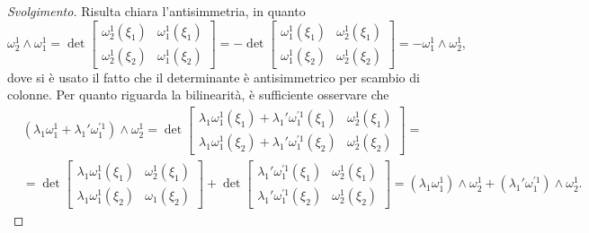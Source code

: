 \begin{proof}[Svolgimento]
    Risulta chiara l'antisimmetria, in quanto
    $$
        \omega_2^1 \wedge \omega_1^1 = \det{\begin{bmatrix}
            \omega_2^1(\xi_1) & \omega_1^1(\xi_1) \\
            \omega_2^1(\xi_2) & \omega_1^1(\xi_2)
        \end{bmatrix}} = - \det{\begin{bmatrix}
            \omega_1^1(\xi_1) & \omega_2^1(\xi_1) \\
            \omega_1^1(\xi_2) & \omega_2^1(\xi_2)
        \end{bmatrix}} = - \omega_1^1 \wedge \omega_2^1,
    $$
    dove si è usato il fatto che il determinante è antisimmetrico per scambio di colonne.
    Per quanto riguarda la bilinearità, è sufficiente osservare che
    \begin{align*}
        &(\lambda_1 \omega_1^1 + \lambda_1' \omega_1^{'1}) \wedge \omega_2^1 = \det{\begin{bmatrix}
            \lambda_1 \omega_1^1(\xi_1) + \lambda_1' \omega_1^{'1}(\xi_1) & \omega_2^1(\xi_1) \\
            \lambda_1 \omega_1^1(\xi_2) + \lambda_1' \omega_1^{'1}(\xi_2) & \omega_2^1(\xi_2)
        \end{bmatrix}} = \\
        &=\det{\begin{bmatrix}
            \lambda_1 \omega_1^1(\xi_1) & \omega_2^1(\xi_1) \\
            \lambda_1 \omega_1^1(\xi_2) & \omega_1(\xi_2)
        \end{bmatrix}} + \det{\begin{bmatrix}
            \lambda_1' \omega_1^{'1}(\xi_1) & \omega_2^1(\xi_1) \\
            \lambda_1' \omega_1^{'1}(\xi_2) & \omega_2^1(\xi_2)
        \end{bmatrix}} = (\lambda_1 \omega_1^1) \wedge \omega_2^1 + (\lambda_1' \omega_1^{'1}) \wedge \omega_2^1.
    \end{align*}
\end{proof}

